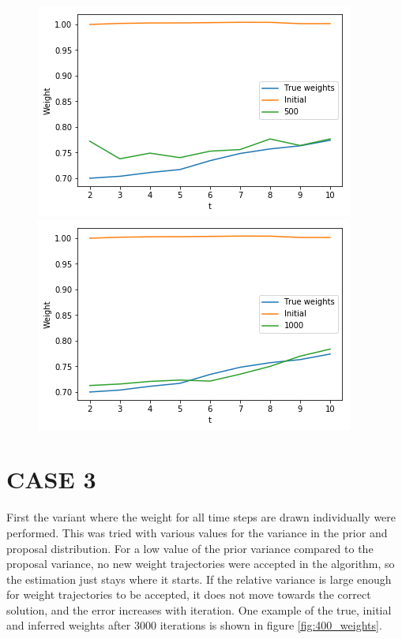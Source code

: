 \begin{figure}[hbt!]
    \includegraphics[scale = 0.4]{fig/10000_500.png}
    \includegraphics[scale = 0.4]{fig/10000_1000.png}
\end{figure}

\newpage


\section{CASE 3}
First the variant where the weight for all time steps are drawn individually were performed. This was tried with various values for the variance in the prior and proposal distribution. For a low value of the prior variance compared to the proposal variance, no new weight trajectories were accepted in the algorithm, so the estimation just stays where it starts. If the relative variance is large enough for weight trajectories to be accepted, it does not move towards the correct solution, and the error increases with iteration. One example of the true, initial and inferred weights after 3000 iterations is shown in figure \ref{fig:400_weights}. 



